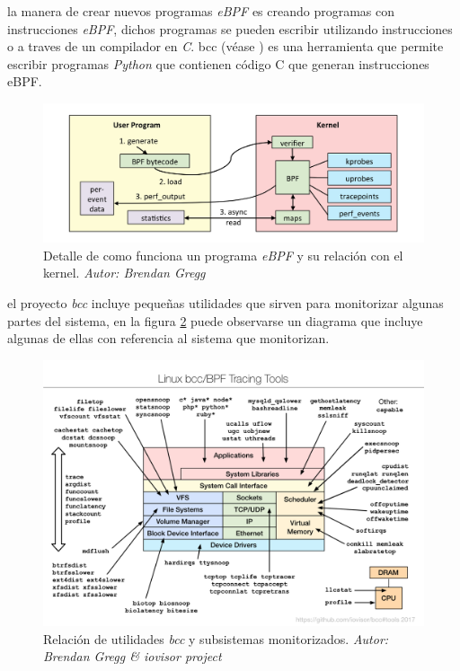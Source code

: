 la manera de crear nuevos programas \emph{eBPF} es creando programas con instrucciones \emph{eBPF}, dichos programas se pueden escribir utilizando
instrucciones o a traves de un compilador en \emph{C}. bcc (véase \cite{bcc-project}) es una herramienta que permite escribir programas \emph{Python} que contienen código C que generan 
instrucciones eBPF.

\begin{figure}[h]
  \centering
    \includegraphics[scale=0.3]{images/linux_ebpf_internals}
  \caption{Detalle de como funciona un programa \emph{eBPF} y su relación con el kernel. \emph{Autor: Brendan Gregg}}
  \label{fig:ebpf-internals}
\end{figure}

el proyecto \emph{bcc} incluye pequeñas utilidades que sirven para monitorizar algunas partes del sistema, en la figura \ref{fig:bcc-tracing-tools} puede observarse un diagrama que incluye algunas de ellas
con referencia al sistema que monitorizan.

\begin{figure}[h]
  \centering
    \includegraphics[scale=0.65]{images/bcc_tracing_tools}
  \caption{Relación de utilidades \emph{bcc} y subsistemas monitorizados. \emph{Autor: Brendan Gregg \& iovisor project}}
  \label{fig:bcc-tracing-tools}
\end{figure}

